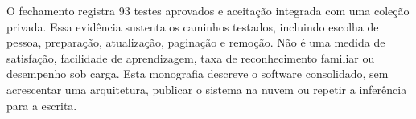 O fechamento registra 93 testes aprovados e aceitação integrada com uma coleção privada. Essa evidência sustenta os caminhos testados, incluindo escolha de pessoa, preparação, atualização, paginação e remoção. Não é uma medida de satisfação, facilidade de aprendizagem, taxa de reconhecimento familiar ou desempenho sob carga. Esta monografia descreve o software consolidado, sem acrescentar uma arquitetura, publicar o sistema na nuvem ou repetir a inferência para a escrita.
